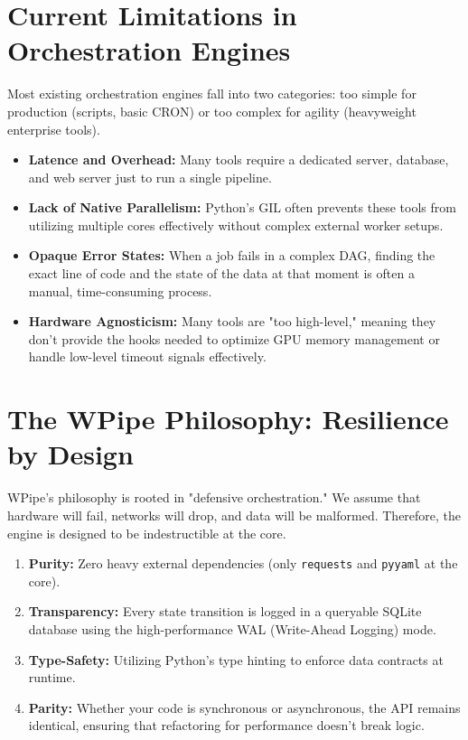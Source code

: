 \documentclass[12pt,a4paper]{report}
\begin{document}
\section{Current Limitations in Orchestration Engines}
Most existing orchestration engines fall into two categories: too simple for production (scripts, basic CRON) or too complex for agility (heavyweight enterprise tools).
\begin{itemize}
    \item \textbf{Latence and Overhead:} Many tools require a dedicated server, database, and web server just to run a single pipeline.
    \item \textbf{Lack of Native Parallelism:} Python's GIL often prevents these tools from utilizing multiple cores effectively without complex external worker setups.
    \item \textbf{Opaque Error States:} When a job fails in a complex DAG, finding the exact line of code and the state of the data at that moment is often a manual, time-consuming process.
    \item \textbf{Hardware Agnosticism:} Many tools are "too high-level," meaning they don't provide the hooks needed to optimize GPU memory management or handle low-level timeout signals effectively.
\end{itemize}

\cleardoublepage
\section{The WPipe Philosophy: Resilience by Design}
WPipe's philosophy is rooted in "defensive orchestration." We assume that hardware will fail, networks will drop, and data will be malformed. Therefore, the engine is designed to be indestructible at the core.
\begin{enumerate}
    \item \textbf{Purity:} Zero heavy external dependencies (only \texttt{requests} and \texttt{pyyaml} at the core).
    \item \textbf{Transparency:} Every state transition is logged in a queryable SQLite database using the high-performance WAL (Write-Ahead Logging) mode.
    \item \textbf{Type-Safety:} Utilizing Python's type hinting to enforce data contracts at runtime.
    \item \textbf{Parity:} Whether your code is synchronous or asynchronous, the API remains identical, ensuring that refactoring for performance doesn't break logic.
\end{enumerate}
\end{document}
